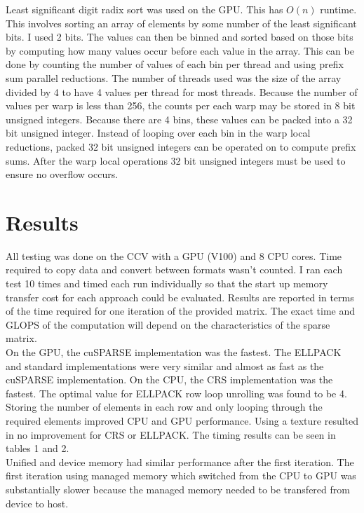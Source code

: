 \documentclass{article}
\begin{document}
Least significant digit radix sort was used on the GPU. This has $O(n)$
runtime. This involves sorting an array of elements by some number of the least
significant bits. I used 2 bits. The values can then be binned and sorted based
on those bits by computing how many values occur before each value in the
array. This can be done by counting the number of values of each bin per thread
and using prefix sum parallel reductions. The number of threads used was the
size of the array divided by 4 to have 4 values per thread for most threads.
Because the number of values per warp is less than 256, the counts per each
warp may be stored in 8 bit unsigned integers. Because there are 4 bins,
these values can be packed into a 32 bit unsigned integer. Instead of looping 
over each bin in the warp local reductions, packed 32 bit unsigned integers
can be operated on to compute prefix sums. After the warp local operations
32 bit unsigned integers must be used to ensure no overflow occurs.

\section{Results}

All testing was done on the CCV with a GPU (V100) and 8 CPU cores.  Time
required to copy data and convert between formats wasn't counted. I ran each
test 10 times and timed each run individually so that the start up memory
transfer cost for each approach could be evaluated.  Results are reported in
terms of the time required for one iteration of the provided matrix.  The exact
time and GLOPS of the computation will depend on the characteristics of the
sparse matrix. \\

On the GPU, the cuSPARSE implementation was the fastest.  The ELLPACK and
standard implementations were very similar and almost as fast as the cuSPARSE
implementation. On the CPU, the CRS implementation was the fastest. The optimal
value for ELLPACK row loop unrolling was found to be 4.  Storing the number of
elements in each row and only looping through the required elements improved
CPU and GPU performance.  Using a texture resulted in no improvement for CRS or
ELLPACK.  The timing results can be seen in tables 1 and 2. \\

Unified and device memory had similar performance after the first iteration.
The first iteration using managed memory which switched from the CPU to GPU was
substantially slower because the managed memory needed to be transfered from
device to host. \\
\end{document}
